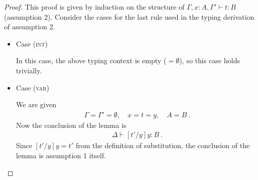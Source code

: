 \begin{proof}
This proof is given by induction on the structure of $\Gamma,x:A,\Gamma' \vdash t:B$ (assumption 2).
Consider the cases for the last rule used in the typing derivation of assumption 2.

\begin{itemize}
\item Case (\textsc{int})
\begin{center}
    \begin{minipage}{.27\linewidth}
    \end{minipage}
\end{center}
In this case, the above typing context is empty ($= \emptyset$), so this case holds trivially.\\


\item Case (\textsc{var})
\begin{center}
    \begin{minipage}{.50\linewidth}
    \end{minipage}
\end{center}
We are given
\begin{gather*}
\Gamma=\Gamma'=\emptyset,\quad
x=t=y,\quad
A = B
~.
\end{gather*}
Now the conclusion of the lemma is
\begin{align*}
\Delta \vdash [t'/y]y:B
~.
\end{align*}
Since $[t'/y]y=t'$ from the definition of substitution, the conclusion of the lemma is assumption 1 itself.\\



\end{itemize}
\end{proof}
